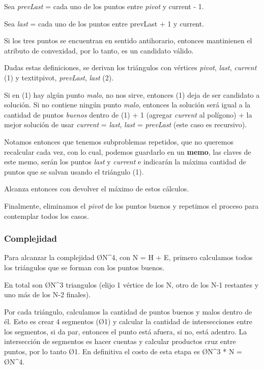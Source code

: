 Sea \textit{prevLast} = cada uno de los puntos entre \textit{pivot} y current - 1.

Sea \textit{last} = cada uno de los puntos entre prevLast + 1 y current.

Si los tres puntos se encuentran en sentido antihorario, entonces mantinienen el atributo de convexidad, por lo tanto, es un candidato válido.

Dadas estas definiciones, se derivan los triángulos con vértices \textit{pivot}, \textit{last}, \textit{current} (1) y textit{pivot}, \textit{prevLast}, \textit{last} (2).

Si en (1) hay algún punto \textit{malo}, no nos sirve, entonces (1) deja de ser candidato a solución. Si no contiene ningún punto \textit{malo}, entonces la solución será igual a la cantidad de puntos \textit{buenos} dentro de (1) + 1 (agregar \textit{current} al polígono) + la mejor solución de usar \textit{current} = \textit{last}, \textit{last} = \textit{prevLast} (este caso es recursivo).

Notamos entonces que tenemos subproblemas repetidos, que no queremos recalcular cada vez, con lo cual, podemos guardarlo en un \textbf{memo}, las claves de este memo, serán los puntos \textit{last} y \textit{current} e indicarán la máxima cantidad de puntos que se salvan usando el triángulo (1).

Alcanza entonces con devolver el máximo de estos cálculos.

Finalmente, eliminamos el \textit{pivot} de los puntos buenos y repetimos el proceso para contemplar todos los casos.

\subsubsection{Complejidad}
Para alcanzar la complejidad \O{N^4}, con N = H + E, primero calculamos todos los triángulos que se forman con los puntos buenos.

En total son \O{N^3} triangulos (elijo 1 vértice de los N, otro de los N-1 restantes y uno más de los N-2 finales).

Por cada triángulo, calculamos la cantidad de puntos buenos y malos dentro de él. Esto es crear 4 segmentos (\O{1}) y calcular la cantidad de intersecciones entre los segmentos, si da par, entonces el punto está afuera, si no, está adentro. La intersección de segmentos es hacer cuentas y calcular productos cruz entre puntos, por lo tanto \O{1}. En definitiva el costo de esta etapa es \O{N^3 * N} = \O{N^4}.

